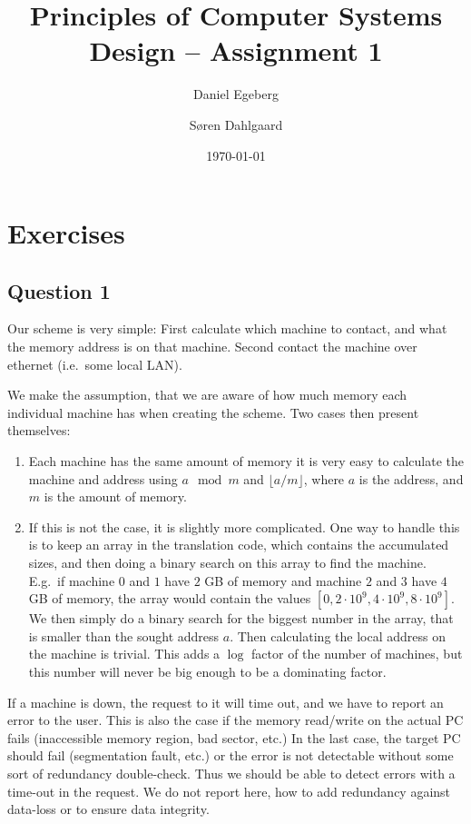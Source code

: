 \documentclass[a4paper,final]{article}
\title{Principles of Computer Systems Design -- Assignment 1}
\date{\today}
\author{Daniel Egeberg \and Søren Dahlgaard}
\begin{document}
\maketitle

\section{Exercises}

\subsection*{Question 1}
Our scheme is very simple: First calculate which machine to contact, and what
the memory address is on that machine. Second contact the machine over ethernet
(i.e.\ some local LAN).

We make the assumption, that we are aware of how much memory each individual
machine has when creating the scheme. Two cases then present themselves:
\begin{enumerate}
    \item Each machine has the same amount of memory it is very easy to
        calculate the machine and address using $a\mod m$ and
        $\lfloor a/m \rfloor$, where $a$ is the address, and $m$ is the amount
        of memory.
    \item If this is not the case, it is slightly more complicated. One way to
        handle this is to keep an array in the translation code, which contains
        the accumulated sizes, and then doing a binary search on this array to
        find the machine. E.g.\ if machine $0$ and $1$ have $2$ GB of memory and
        machine $2$ and $3$ have $4$ GB of memory, the array would contain
        the values $[0, 2\cdot 10^9, 4\cdot 10^9, 8\cdot 10^9]$. We then simply
        do a binary search for the biggest number in the array, that is smaller
        than the sought address $a$. Then calculating the local address on the
        machine is trivial. This adds a $\log$ factor of the number of
        machines, but this number will never be big enough to be a dominating
        factor.
\end{enumerate}

If a machine is down, the request to it will time out, and we have to report an
error to the user. This is also the case if the memory read/write on the actual
PC fails (inaccessible memory region, bad sector, etc.) In the last case, the
target PC should fail (segmentation fault, etc.) or the error is not detectable
without some sort of redundancy double-check. Thus we should be able to detect
errors with a time-out in the request. We do not report here, how to add
redundancy against data-loss or to ensure data integrity.
\end{document}
